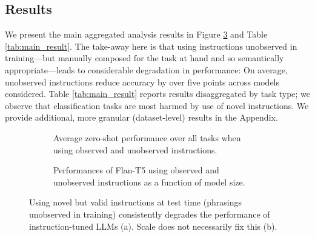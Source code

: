 \subsection{Results}
\label{section:main-analysis-results}

We present the main aggregated analysis results in Figure \ref{fig:main-results} and Table \ref{tab:main_result}.
The take-away here is that using instructions unobserved in training---but manually composed for the task at hand and so semantically appropriate---leads to considerable degradation in performance: On average, unobserved instructions reduce accuracy by over five points across models considered.
Table \ref{tab:main_result} reports results disaggregated by task type; we observe that classification tasks are most harmed by use of novel instructions.
We provide additional, more granular (dataset-level) results in the Appendix.

\begin{figure}[htbp]
  \centering
  \begin{subfigure}{0.475\textwidth}
    \caption{Average zero-shot performance over all tasks when using observed and unobserved instructions.}
    \label{fig:main-results-main_results}
  \end{subfigure}
  \hfill
  \begin{subfigure}{0.475\textwidth}
    \caption{Performances of Flan-T5 using observed and unobserved instructions as a function of model size.}
    \label{fig:main_scaling_reesults}
  \end{subfigure}
  \caption{Using novel but valid instructions at test time (phrasings unobserved in training) consistently degrades the performance of instruction-tuned LLMs (a). Scale does not necessarily fix this (b).}
  \label{fig:main-results}
\end{figure}

\begin{comment}
\begin{figure}
  \centering
  \texttt{[image: images/main\_results\_v4.pdf]}
  \caption{Average performance across tasks between observed and unobserved instructions.}
  \label{fig:main_results}
\end{figure}

\begin{figure}
  \centering
  \texttt{[image: images/main\_scaling\_results\_v1.pdf]}
  \caption{}
  \label{fig:main_scaling_results}
\end{figure}
\end{comment}


